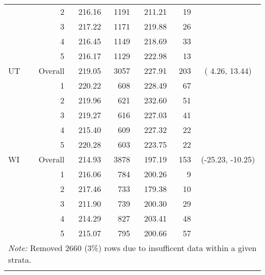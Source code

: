 \begin{longtable}{lrrr@{\extracolsep{.25cm}}rrc}
   & 2 & 216.16 & 1191 & 211.21 &  19 &  \\ 
   & 3 & 217.22 & 1171 & 219.88 &  26 &  \\ 
   & 4 & 216.45 & 1149 & 218.69 &  33 &  \\ 
   & 5 & 216.17 & 1129 & 222.98 &  13 &  \\ 
   \hline
UT & Overall & 219.05 & 3057 & 227.91 & 203 & (  4.26,  13.44) \\ 
   & 1 & 220.22 & 608 & 228.49 &  67 &  \\ 
   & 2 & 219.96 & 621 & 232.60 &  51 &  \\ 
   & 3 & 219.27 & 616 & 227.03 &  41 &  \\ 
   & 4 & 215.40 & 609 & 227.32 &  22 &  \\ 
   & 5 & 220.28 & 603 & 223.75 &  22 &  \\ 
   \hline
WI & Overall & 214.93 & 3878 & 197.19 & 153 & (-25.23, -10.25) \\ 
   & 1 & 216.06 & 784 & 200.26 &   9 &  \\ 
   & 2 & 217.46 & 733 & 179.38 &  10 &  \\ 
   & 3 & 211.90 & 739 & 200.30 &  29 &  \\ 
   & 4 & 214.29 & 827 & 203.41 &  48 &  \\ 
   & 5 & 215.07 & 795 & 200.66 &  57 &  \\ 
   \hline \multicolumn{7}{l}{\textit{Note:} Removed 2660 (3\%) rows due to insufficent data within a given strata.} \\\hline
\label{g4read-mlpsa-lrAIC}
\end{longtable}
